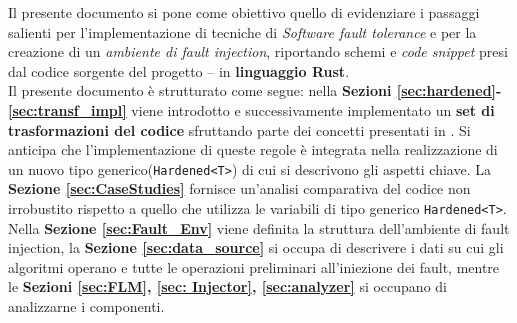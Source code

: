 \noindent 
Il presente documento si pone come obiettivo quello di evidenziare i passaggi salienti per l'implementazione di tecniche di \textit{Software fault tolerance} e per la creazione di un \textit{ambiente di fault injection}, riportando schemi e \textit{code snippet}  presi dal codice sorgente del progetto -- in \textbf{linguaggio Rust}.\\
Il presente documento è strutturato come segue: nella \textbf{Sezioni \ref{sec:hardened}-\ref{sec:transf_impl}} viene introdotto e successivamente implementato un \textbf{set di trasformazioni del codice} sfruttando parte dei concetti presentati in \cite{rebaudengo1999soft}. Si anticipa che l'implementazione di queste regole è integrata nella realizzazione di un nuovo tipo generico(\texttt{Hardened<T>}) di cui si descrivono gli aspetti chiave. La \textbf{Sezione \ref{sec:CaseStudies}} fornisce un'analisi comparativa del codice non irrobustito rispetto a quello che utilizza le variabili di tipo generico \texttt{Hardened<T>}. Nella \textbf{Sezione \ref{sec:Fault_Env}} viene definita la struttura dell'ambiente di fault injection, la \textbf{
    Sezione \ref{sec:data_source} 
} si occupa di descrivere i dati su cui gli algoritmi operano e tutte le operazioni preliminari all'iniezione dei fault, mentre le \textbf{Sezioni \ref{sec:FLM}, \ref{sec: Injector}, \ref{sec:analyzer}} si occupano di analizzarne i componenti.
